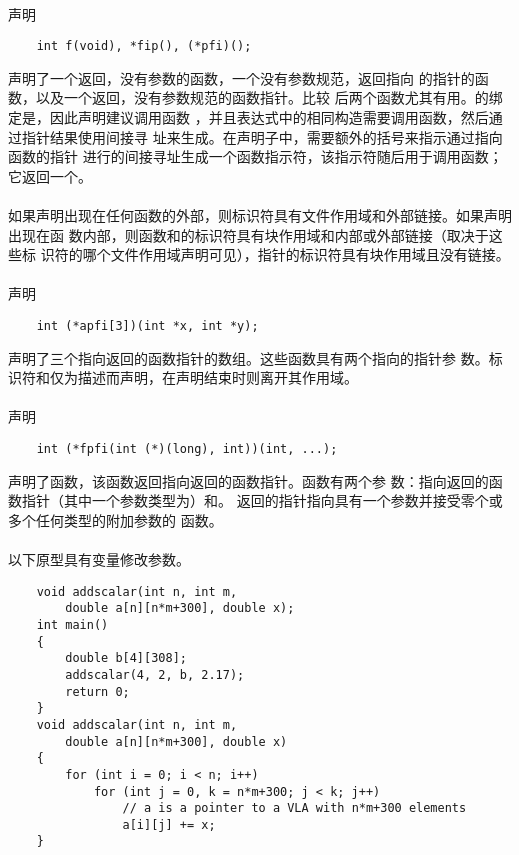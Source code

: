 {\paragraph{}
\ex 声明
\begin{lstlisting}
    int f(void), *fip(), (*pfi)();
\end{lstlisting}
声明了一个返回，没有参数的函数，一个没有参数规范，返回指向
的指针的函数，以及一个返回，没有参数规范的函数指针。比较
后两个函数尤其有用。的绑定是，因此声明建议调用函数
，并且表达式中的相同构造需要调用函数，然后通过指针结果使用间接寻
址来生成。在声明子中，需要额外的括号来指示通过指向函数的指针
进行的间接寻址生成一个函数指示符，该指示符随后用于调用函数；它返回一个。

\paragraph{}
如果声明出现在任何函数的外部，则标识符具有文件作用域和外部链接。如果声明出现在函
数内部，则函数和的标识符具有块作用域和内部或外部链接（取决于这些标
识符的哪个文件作用域声明可见），指针的标识符具有块作用域且没有链接。

\paragraph{}
\ex 声明
\begin{lstlisting}
    int (*apfi[3])(int *x, int *y);
\end{lstlisting}
声明了三个指向返回的函数指针的数组。这些函数具有两个指向的指针参
数。标识符和仅为描述而声明，在声明结束时则离开其作用域。

\paragraph{}
\ex 声明
\begin{lstlisting}
    int (*fpfi(int (*)(long), int))(int, ...);
\end{lstlisting}
声明了函数，该函数返回指向返回的函数指针。函数有两个参
数：指向返回的函数指针（其中一个参数类型为）和。
返回的指针指向具有一个参数并接受零个或多个任何类型的附加参数的
函数。

\paragraph{}
\ex 以下原型具有变量修改参数。
\begin{lstlisting}
    void addscalar(int n, int m,
        double a[n][n*m+300], double x);
    int main()
    {
        double b[4][308];
        addscalar(4, 2, b, 2.17);
        return 0;
    }
    void addscalar(int n, int m,
        double a[n][n*m+300], double x)
    {
        for (int i = 0; i < n; i++)
            for (int j = 0, k = n*m+300; j < k; j++)
                // a is a pointer to a VLA with n*m+300 elements
                a[i][j] += x;
    }
\end{lstlisting}

}
